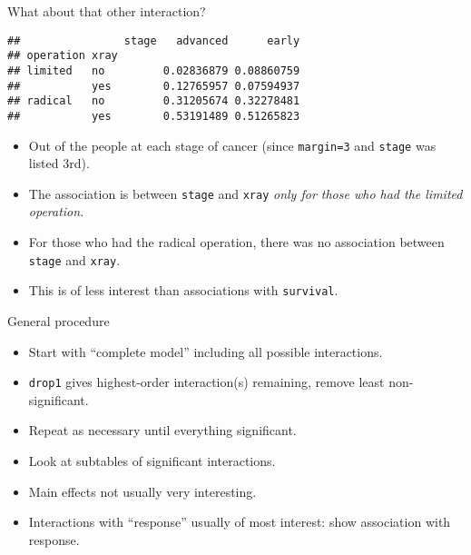 \begin{frame}[fragile]{What about that other interaction?}
  
\begin{knitrout}
\color{fgcolor}\begin{kframe}
\begin{alltt}
\hlkwb{=}\hlopt{~}\hlopt{+}\hlopt{+}
\hlstd{(}\hlstd{=}\hlstd{))}
\end{alltt}
\begin{verbatim}
##                stage   advanced      early
## operation xray                            
## limited   no         0.02836879 0.08860759
##           yes        0.12765957 0.07594937
## radical   no         0.31205674 0.32278481
##           yes        0.53191489 0.51265823
\end{verbatim}
\end{kframe}
\end{knitrout}

\begin{itemize}
\item Out of the people at each stage of cancer (since
  \texttt{margin=3} and \texttt{stage} was listed 3rd).
\item The association is between \texttt{stage} and \texttt{xray}
  \emph{only for those who had the limited operation}.
\item For those who
  had the radical operation, there was no association between
  \texttt{stage} and \texttt{xray}.
\item This is of less interest than associations with
  \texttt{survival}. 
\end{itemize}
  
\end{frame}

\begin{frame}[fragile]{General procedure}

\begin{itemize}
\item Start with ``complete model'' including all possible interactions.
\item \texttt{drop1} gives highest-order interaction(s) remaining, remove least non-significant.
\item Repeat as necessary until everything significant.
\item Look at subtables of significant interactions.
  \item Main effects not usually very interesting.
\item Interactions with ``response'' usually of most interest: show association with response.
\end{itemize}
\end{frame}

